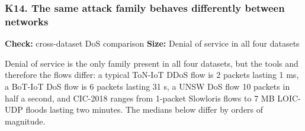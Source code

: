 \documentclass[10pt,a4paper]{article}
\newcommand{\meta}[2]{{\small\color{muted}\textbf{Check:} #1 \quad\textbar\quad \textbf{Size:} #2}}
\newenvironment{problem}{\par\noindent\begin{minipage}{\linewidth}\setlength{\parskip}{4pt}}{\end{minipage}\par\bigskip}
\begin{document}
\begin{problem}
\subsubsection*{K14. The same attack family behaves differently between networks}
\meta{cross-dataset DoS comparison}{Denial of service in all four datasets}

Denial of service is the only family present in all four datasets, but the tools and therefore the flows differ: a typical ToN-IoT DDoS flow is 2 packets lasting 1 ms, a BoT-IoT DoS flow is 6 packets lasting 31 s, a UNSW DoS flow 10 packets in half a second, and CIC-2018 ranges from 1-packet Slowloris flows to 7 MB LOIC-UDP floods lasting two minutes. The medians below differ by orders of magnitude.


\end{problem}
\end{document}
